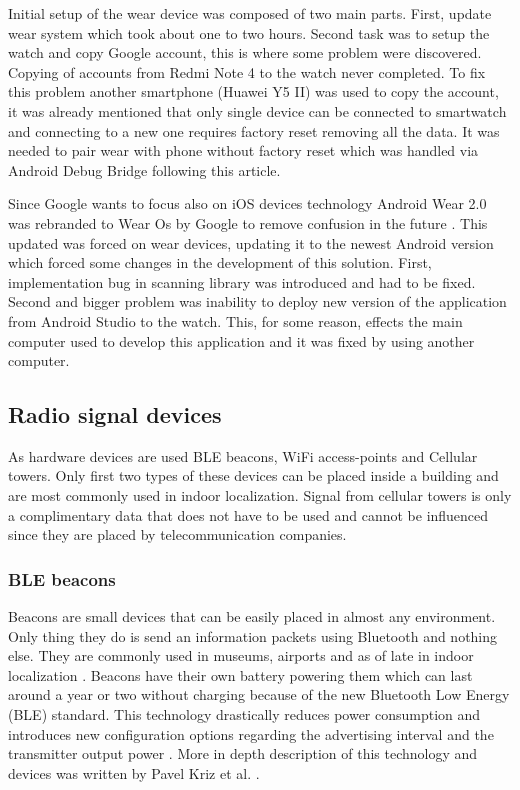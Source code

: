 Initial setup of the wear device was composed of two main parts. First, update wear system which took about one to two hours. Second task was to setup the watch and copy Google account, this is where some problem were discovered. Copying of accounts from Redmi Note 4 to the watch never completed. To fix this problem another smartphone (Huawei Y5 II) was used to copy the account, it was already mentioned that only single device can be connected to smartwatch and connecting to a new one requires factory reset removing all the data. It was needed to pair wear with phone without factory reset which was handled via Android Debug Bridge following this \cite{HtPAWW} article.

Since Google wants to focus also on iOS devices technology Android Wear 2.0 was rebranded to Wear Os by Google to remove confusion in the future \cite{AWITFNM}. This updated was forced on wear devices, updating it to the newest Android version which forced some changes in the development of this solution. First, implementation bug in scanning library was introduced and had to be fixed. Second and bigger problem was inability to deploy new version of the application from Android Studio to the watch. This, for some reason, effects the main computer used to develop this application and it was fixed by using another computer.

\subsection{Radio signal devices}\label{subsec:RSD}
As hardware devices are used BLE beacons, WiFi access-points and Cellular towers. Only first two types of these devices can be placed inside a building and are most commonly used in indoor localization. Signal from cellular towers is only a complimentary data that does not have to be used and cannot be influenced since they are placed by telecommunication companies.

\subsubsection{BLE beacons}\label{subsec:BLEBeacons}
Beacons are small devices that can be easily placed in almost any environment. Only thing they do is send an information packets using Bluetooth and nothing else. They are commonly used in museums, airports and as of late in indoor localization \cite{10TABB}. Beacons have their own battery powering them which can last around a year or two without charging because of the new Bluetooth Low Energy (BLE) standard. This technology drastically reduces power consumption and introduces new configuration
options regarding the advertising interval and the transmitter output power \cite{IPSBOBLE}. More in depth description of this technology and devices was written by Pavel Kriz et al. \cite{IILUBLEB}.

